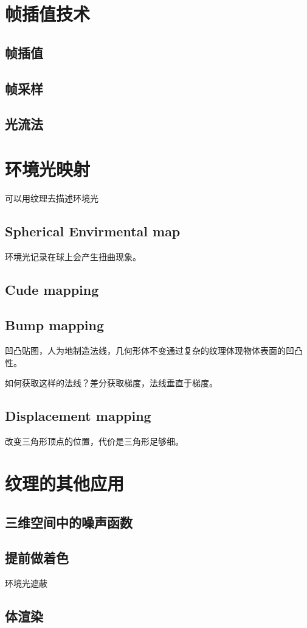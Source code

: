 \section{帧插值技术}

\subsection*{帧插值}

\subsection*{帧采样}

\subsection*{光流法}

\section{环境光映射}

可以用纹理去描述环境光

\subsection*{Spherical Envirmental map}

环境光记录在球上会产生扭曲现象。

\subsection*{Cude mapping}

\subsection*{Bump mapping}

凹凸贴图，人为地制造法线，几何形体不变通过复杂的纹理体现物体表面的凹凸性。

如何获取这样的法线？差分获取梯度，法线垂直于梯度。

\subsection*{Displacement mapping}

改变三角形顶点的位置，代价是三角形足够细。

\section{纹理的其他应用}

\subsection*{三维空间中的噪声函数}

\subsection*{提前做着色}

环境光遮蔽

\subsection*{体渲染}
